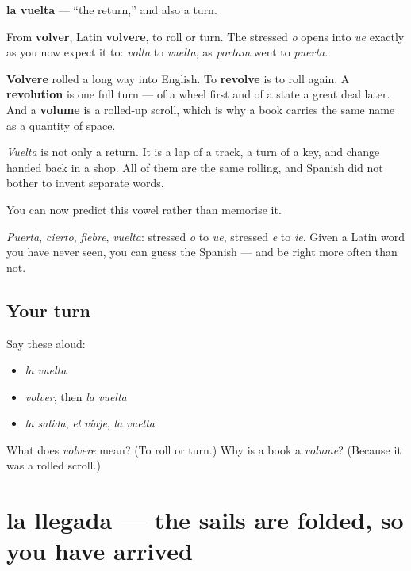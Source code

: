 \begin{cousinweb}
\textbf{la vuelta} — \textquotedblleft{}the return,\textquotedblright{} and also a turn.

From \textbf{volver}, Latin \textbf{volvere}, to roll or turn. The stressed \emph{o} opens into \emph{ue} exactly as you now expect it to: \emph{volta} to \emph{vuelta}, as \emph{portam} went to \emph{puerta}.

\textbf{Volvere} rolled a long way into English. To \textbf{revolve} is to roll again. A \textbf{revolution} is one full turn — of a wheel first and of a state a great deal later. And a \textbf{volume} is a rolled-up scroll, which is why a book carries the same name as a quantity of space.

\emph{Vuelta} is not only a return. It is a lap of a track, a turn of a key, and change handed back in a shop. All of them are the same rolling, and Spanish did not bother to invent separate words.
\end{cousinweb}

\begin{grammarlens}[title={What you've built}]
You can now predict this vowel rather than memorise it.

\emph{Puerta}, \emph{cierto}, \emph{fiebre}, \emph{vuelta}: stressed \emph{o} to \emph{ue}, stressed \emph{e} to \emph{ie}. Given a Latin word you have never seen, you can guess the Spanish — and be right more often than not.
\end{grammarlens}

\subsection*{Your turn}
Say these aloud:

\begin{itemize}
\raggedright
  \item \emph{la vuelta}
  \item \emph{volver}, then \emph{la vuelta}
  \item \emph{la salida}, \emph{el viaje}, \emph{la vuelta}
\end{itemize}

\begin{tcolorbox}[breakable,colback=teal!4,colframe=teal!35!black,title={Before you move on}]
What does \emph{volvere} mean? (To roll or turn.) Why is a book a \emph{volume}? (Because it was a rolled scroll.)
\end{tcolorbox}
\section[la llegada]{la llegada — the sails are folded, so you have arrived}

